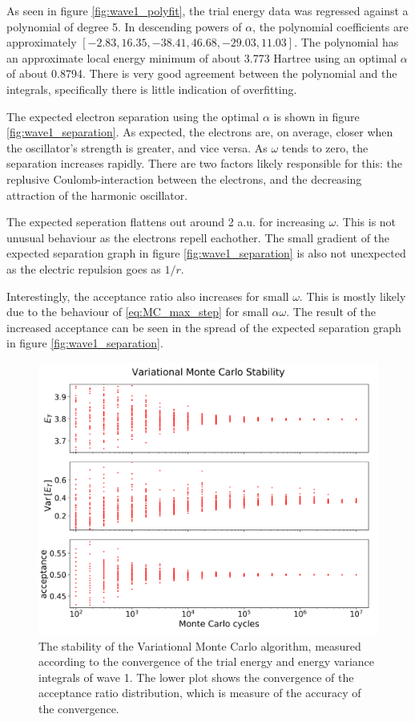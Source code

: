 \documentclass[nofootinbib,reprint,english]{revtex4-1}
\begin{document}
As seen in figure \ref{fig:wave1_polyfit}, the trial energy data was regressed against a polynomial of degree 5. In descending powers of \(\alpha\), the polynomial coefficients are approximately \([-2.83,16.35,-38.41,46.68,-29.03,11.03]\). The polynomial has an approximate local energy minimum of about 3.773 Hartree using an optimal \(\alpha\) of about 0.8794. There is very good agreement between the polynomial and the integrals, specifically there is little indication of overfitting.

The expected electron separation using the optimal \(\alpha\) is shown in figure \ref{fig:wave1_separation}. As expected, the electrons are, on average, closer when the oscillator's strength is greater, and vice versa. As \(\omega\) tends to zero, the separation increases rapidly. There are two factors likely responsible for this: the replusive Coulomb-interaction between the electrons, and the decreasing attraction of the harmonic oscillator.

The expected seperation flattens out around 2 a.u. for increasing \(\omega\). This is not unusual behaviour as the electrons repell eachother. The small gradient of the expected separation graph in figure \ref{fig:wave1_separation} is also not unexpected as the electric repulsion goes as \(1/r\).

Interestingly, the acceptance ratio also increases for small \(\omega\). This is mostly likely due to the behaviour of \eqref{eq:MC_max_step} for small \(\alpha\omega\). The result of the increased acceptance can be seen in the spread of the expected separation graph in figure \ref{fig:wave1_separation}.

\begin{figure}[h!]
\centering
\includegraphics[scale=0.34]{../results/wave1/stability_2_edited.png}
\caption{The stability of the Variational Monte Carlo algorithm, measured according to the convergence of the trial energy and energy variance integrals of wave 1. The lower plot shows the convergence of the acceptance ratio distribution, which is measure of the accuracy of the convergence.}\label{fig:wave1_stability}
\end{figure}
\end{document}
